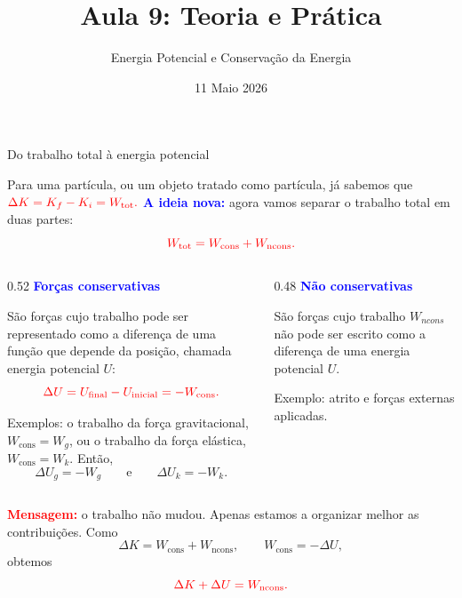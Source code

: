 \documentclass{beamer}
\title{Aula 9: Teoria e Prática}
\subtitle{Energia Potencial e Conservação da Energia}
\date{11 Maio 2026}
\begin{document}
	
	\frame{\titlepage}
	
	
	\begin{frame}{Do trabalho total à energia potencial}
		\scriptsize
		
		Para uma partícula, ou um objeto tratado como partícula, já sabemos que
		$
		\textcolor{red}{\Delta K=K_f-K_i=W_{\text{tot}}.}
		$
		\textcolor{blue}{\textbf{A ideia nova:}} agora vamos separar o trabalho total em duas partes:
		\[
		\textcolor{red}{W_{\text{tot}}=W_{\text{cons}}+W_{\text{ncons}}.}
		\]
		
		\begin{columns}[T]
			\begin{column}{0.52\textwidth}
				\textcolor{blue}{\textbf{Forças conservativas}}
				
				São forças cujo trabalho pode ser representado como a diferença de uma função que depende da posição, chamada energia potencial \(U\):
				\[
				\textcolor{red}{\Delta U=U_{\text{final}}-U_{\text{inicial}}=-W_{\text{cons}}.}
				\]
				
				Exemplos: o trabalho da força gravitacional, \(W_{\text{cons}}=W_g\), ou o trabalho da força elástica, \(W_{\text{cons}}=W_k\). Então,
				\[
				\Delta U_g=-W_g
				\qquad \text{e} \qquad
				\Delta U_k=-W_k.
				\]
			\end{column}
			
			\begin{column}{0.48\textwidth}
				\textcolor{blue}{\textbf{Não conservativas}}
				
				São forças cujo trabalho $W_{ncons}$ não pode ser escrito como a diferença de uma energia potencial \(U\).
				
				Exemplo: atrito e forças externas aplicadas.
				
				\vspace{0.1cm}
			\end{column}
		\end{columns}
		
		\vspace{0.1cm}
		
		\textcolor{red}{\textbf{Mensagem:}} o trabalho não mudou. Apenas estamos a organizar melhor as contribuições. Como
		\[
		\Delta K=W_{\text{cons}}+W_{\text{ncons}},
		\qquad
		W_{\text{cons}}=-\Delta U,
		\]
		obtemos
		\[
		\textcolor{red}{\Delta K+\Delta U=W_{\text{ncons}}.}
		\]
		
	\end{frame}
	
\end{document}
